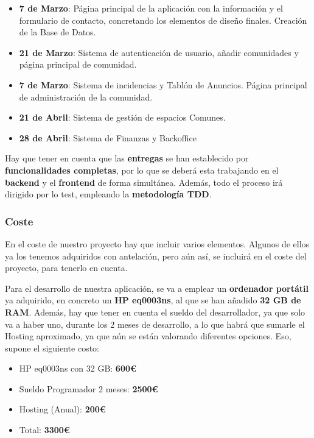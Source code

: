 \begin{itemize}
	\item \textbf{7 de Marzo}: Página principal de la aplicación con la información y el formulario de contacto, concretando los elementos de diseño finales. Creación de la Base de Datos.
	
	\item \textbf{21 de Marzo}: Sistema de autenticación de usuario, añadir comunidades y página principal de comunidad. 
	
	\item \textbf{7 de Marzo}: Sistema de incidencias y Tablón de Anuncios. Página principal de administración de la comunidad.
	
	\item \textbf{21 de Abril}:  Sistema de gestión de espacios Comunes.
	
	\item \textbf{28 de Abril}: Sistema de Finanzas y Backoffice
\end{itemize}

Hay que tener en cuenta que las \textbf{entregas} se han establecido por \textbf{funcionalidades completas}, por lo que se deberá esta trabajando en el \textbf{backend} y el \textbf{frontend} de forma simultánea. Además, todo el proceso irá dirigido por lo test, empleando la \textbf{metodología TDD}.

\subsubsection{Coste}
En el coste de nuestro proyecto hay que incluir varios elementos. Algunos de ellos ya los tenemos adquiridos con antelación, pero aún así, se incluirá en el coste del proyecto, para tenerlo en cuenta.

Para el desarrollo de nuestra aplicación, se va a emplear un \textbf{ordenador portátil} ya adquirido, en concreto un \textbf{HP eq0003ns}, al que se han añadido \textbf{32 GB de RAM}. Además, hay que tener en cuenta el sueldo del desarrollador, ya que solo va a haber uno, durante los 2 meses de desarrollo, a lo que habrá que sumarle el Hosting aproximado, ya que aún se están valorando diferentes opciones. Eso, supone el siguiente costo:

\begin{itemize}
	\item HP eq0003ns con 32 GB: \textbf{600€}
	\item Sueldo Programador 2 meses: \textbf{2500€}
	\item Hosting (Anual): \textbf{200€}
	\item Total: \textbf{3300€}
\end{itemize}

